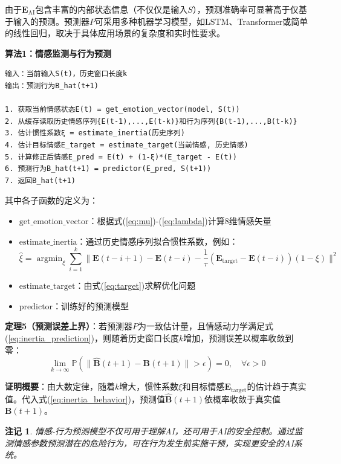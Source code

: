 \documentclass[12pt,a4paper]{article}
\theoremstyle{plain}
\newtheorem{remark}{注记}[section]
\newcommand{\ve}[1]{\bm{#1}}                    %
\newcommand{\Evec}{\ve{E}}                        %
\newcommand{\Bvec}{\ve{B}}                        %
\DeclareMathOperator*{\argmin}{argmin}
\begin{document}
由于$\Evec_{\text{AI}}$包含丰富的内部状态信息（不仅仅是输入$S$），预测准确率可显著高于仅基于输入的预测。预测器$P$可采用多种机器学习模型，如LSTM、Transformer或简单的线性回归，取决于具体应用场景的复杂度和实时性要求。

\textbf{算法1：情感监测与行为预测}
\begin{verbatim}
输入：当前输入S(t)，历史窗口长度k
输出：预测行为B_hat(t+1)

1. 获取当前情感状态E(t) = get_emotion_vector(model, S(t))
2. 从缓存读取历史情感序列{E(t-1),...,E(t-k)}和行为序列{B(t-1),...,B(t-k)}
3. 估计惯性系数ξ = estimate_inertia(历史序列)
4. 估计目标情感E_target = estimate_target(当前情感, 历史情感)
5. 计算修正后情感E_pred = E(t) + (1-ξ)*(E_target - E(t))
6. 预测行为B_hat(t+1) = predictor(E_pred, S(t+1))
7. 返回B_hat(t+1)
\end{verbatim}

其中各子函数的定义为：
\begin{itemize}
    \item $\text{get\_emotion\_vector}$：根据式(\ref{eq:mu})-(\ref{eq:lambda})计算8维情感矢量
    \item $\text{estimate\_inertia}$：通过历史情感序列拟合惯性系数，例如：
    \begin{equation}
    \hat{\xi} = \argmin_{\xi} \sum_{i=1}^{k} \| \Evec(t-i+1) - \Evec(t-i) - \frac{1}{\tau}(\Evec_{\text{target}} - \Evec(t-i))(1-\xi) \|^2
    \end{equation}
    \item $\text{estimate\_target}$：由式(\ref{eq:target})求解优化问题
    \item $\text{predictor}$：训练好的预测模型
\end{itemize}

\textbf{定理5（预测误差上界）}：若预测器$P$为一致估计量，且情感动力学满足式(\ref{eq:inertia_prediction})，则随着历史窗口长度$k$增加，预测误差以概率收敛到零：
\begin{equation}
\lim_{k \to \infty} \mathbb{P}\left( \| \hat{\Bvec}(t+1) - \Bvec(t+1) \| > \epsilon \right) = 0, \quad \forall \epsilon > 0
\end{equation}

\textbf{证明概要}：由大数定律，随着$k$增大，惯性系数$\xi$和目标情感$\Evec_{\text{target}}$的估计趋于真实值。代入式(\ref{eq:inertia_behavior})，预测值$\hat{\Bvec}(t+1)$依概率收敛于真实值$\Bvec(t+1)$。

\begin{remark}
情感-行为预测模型不仅可用于理解AI，还可用于AI的安全控制。通过监测情感参数预测潜在的危险行为，可在行为发生前实施干预，实现更安全的AI系统。
\end{remark}
\end{document}
